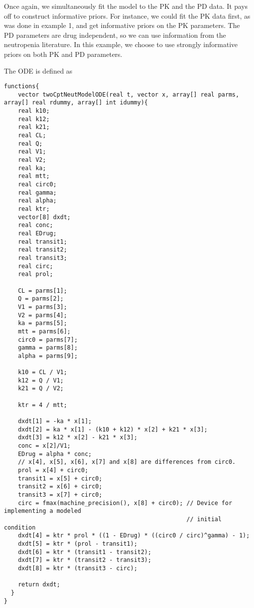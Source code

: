 \documentclass[12pt, reqno, oneside]{amsbook}
\numberwithin{equation}{chapter}
\numberwithin{figure}{chapter}
\numberwithin{table}{chapter}
\theoremstyle{remark}
\begin{document}
Once again, we simultaneously fit the model to the PK and the PD
data. It pays off to construct informative priors. For instance, we could
fit the PK data first, as was done in  example 1, and get informative
priors on the PK parameters. The PD parameters are drug independent,
so we can use information from the neutropenia literature. In this
example, we choose to use strongly informative priors on both PK and PD
parameters.

The ODE is defined as
\begin{verbatim}
functions{
    vector twoCptNeutModelODE(real t, vector x, array[] real parms, array[] real rdummy, array[] int idummy){
    real k10;
    real k12;
    real k21;
    real CL;
    real Q;
    real V1;
    real V2;
    real ka;
    real mtt;
    real circ0;
    real gamma;
    real alpha;
    real ktr;
    vector[8] dxdt;
    real conc;
    real EDrug;
    real transit1;
    real transit2;
    real transit3;
    real circ;
    real prol;

    CL = parms[1];
    Q = parms[2];
    V1 = parms[3];
    V2 = parms[4];
    ka = parms[5];
    mtt = parms[6];
    circ0 = parms[7];
    gamma = parms[8];
    alpha = parms[9];

    k10 = CL / V1;
    k12 = Q / V1;
    k21 = Q / V2;

    ktr = 4 / mtt;

    dxdt[1] = -ka * x[1];
    dxdt[2] = ka * x[1] - (k10 + k12) * x[2] + k21 * x[3];
    dxdt[3] = k12 * x[2] - k21 * x[3];
    conc = x[2]/V1;
    EDrug = alpha * conc;
    // x[4], x[5], x[6], x[7] and x[8] are differences from circ0.
    prol = x[4] + circ0;
    transit1 = x[5] + circ0;
    transit2 = x[6] + circ0;
    transit3 = x[7] + circ0;
    circ = fmax(machine_precision(), x[8] + circ0); // Device for implementing a modeled
                                                    // initial condition
    dxdt[4] = ktr * prol * ((1 - EDrug) * ((circ0 / circ)^gamma) - 1);
    dxdt[5] = ktr * (prol - transit1);
    dxdt[6] = ktr * (transit1 - transit2);
    dxdt[7] = ktr * (transit2 - transit3);
    dxdt[8] = ktr * (transit3 - circ);

    return dxdt;
  }
}
\end{verbatim}
\end{document}
